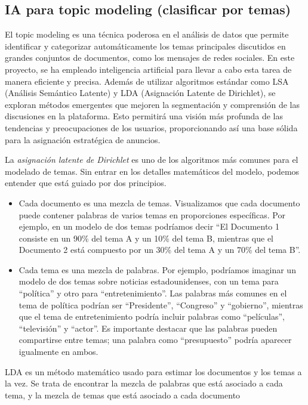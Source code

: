 \documentclass[
  letterpaper,
  DIV=11,
  numbers=noendperiod]{scrartcl}
\begin{document}
\subsection{IA para topic modeling (clasificar por
temas)}\label{ia-para-topic-modeling-clasificar-por-temas}

El topic modeling es una técnica poderosa en el análisis de datos que
permite identificar y categorizar automáticamente los temas principales
discutidos en grandes conjuntos de documentos, como los mensajes de
redes sociales. En este proyecto, se ha empleado inteligencia artificial
para llevar a cabo esta tarea de manera eficiente y precisa. Además de
utilizar algoritmos estándar como LSA (Análisis Semántico Latente) y LDA
(Asignación Latente de Dirichlet), se exploran métodos emergentes que
mejoren la segmentación y comprensión de las discusiones en la
plataforma. Esto permitirá una visión más profunda de las tendencias y
preocupaciones de los usuarios, proporcionando así una base sólida para
la asignación estratégica de anuncios.

La \emph{asignación latente de Dirichlet} es uno de los algoritmos más
comunes para el modelado de temas. Sin entrar en los detalles
matemáticos del modelo, podemos entender que está guiado por dos
principios.

\begin{itemize}
\item
  Cada documento es una mezcla de temas. Visualizamos que cada documento
  puede contener palabras de varios temas en proporciones específicas.
  Por ejemplo, en un modelo de dos temas podríamos decir ``El Documento
  1 consiste en un 90\% del tema A y un 10\% del tema B, mientras que el
  Documento 2 está compuesto por un 30\% del tema A y un 70\% del tema
  B''.
\item
  Cada tema es una mezcla de palabras. Por ejemplo, podríamos imaginar
  un modelo de dos temas sobre noticias estadounidenses, con un tema
  para ``política'' y otro para ``entretenimiento''. Las palabras más
  comunes en el tema de política podrían ser ``Presidente'',
  ``Congreso'' y ``gobierno'', mientras que el tema de entretenimiento
  podría incluir palabras como ``películas'', ``televisión'' y
  ``actor''. Es importante destacar que las palabras pueden compartirse
  entre temas; una palabra como ``presupuesto'' podría aparecer
  igualmente en ambos.
\end{itemize}

LDA es un método matemático usado para estimar los documentos y los
temas a la vez. Se trata de encontrar la mezcla de palabras que está
asociado a cada tema, y la mezcla de temas que está asociado a cada
documento
\end{document}

